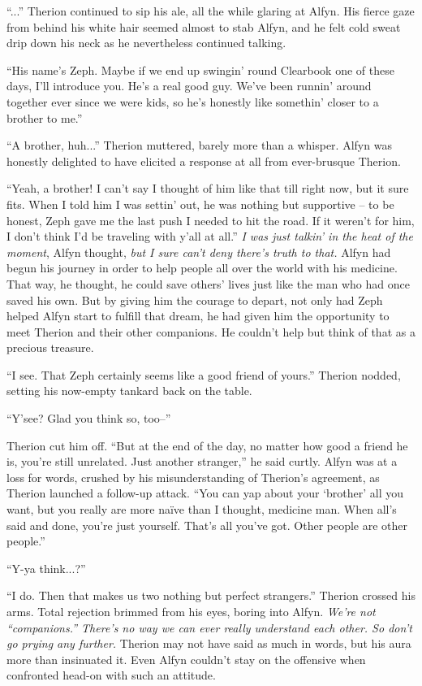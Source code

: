 ``...'' Therion continued to sip his ale, all the while glaring at Alfyn. His fierce gaze from behind his white hair seemed almost to stab Alfyn, and he felt cold sweat drip down his neck as he nevertheless continued talking.

``His name's Zeph. Maybe if we end up swingin' round Clearbook one of these days, I'll introduce you. He's a real good guy. We've been runnin' around together ever since we were kids, so he's honestly like somethin' closer to a brother to me.''

``A brother, huh...'' Therion muttered, barely more than a whisper. Alfyn was honestly delighted to have elicited a response at all from ever-brusque Therion.

``Yeah, a brother! I can't say I thought of him like that till right now, but it sure fits. When I told him I was settin' out, he was nothing but supportive -- to be honest, Zeph gave me the last push I needed to hit the road. If it weren't for him, I don't think I'd be traveling with y'all at all.'' \emph{I was just talkin' in the heat of the moment}, Alfyn thought, \emph{but I sure can't deny there's truth to that.} Alfyn had begun his journey in order to help people all over the world with his medicine. That way, he thought, he could save others' lives just like the man who had once saved his own. But by giving him the courage to depart, not only had Zeph helped Alfyn start to fulfill that dream, he had given him the opportunity to meet Therion and their other companions. He couldn't help but think of that as a precious treasure.

``I see. That Zeph certainly seems like a good friend of yours.'' Therion nodded, setting his now-empty tankard back on the table.

``Y'see? Glad you think so, too--''

Therion cut him off. ``But at the end of the day, no matter how good a friend he is, you're still unrelated. Just another stranger,'' he said curtly. Alfyn was at a loss for words, crushed by his misunderstanding of Therion's agreement, as Therion launched a follow-up attack. ``You can yap about your `brother' all you want, but you really are more naïve than I thought, medicine man. When all's said and done, you're just yourself. That's all you've got. Other people are other people.''

``Y-ya think...?''

``I do. Then that makes us two nothing but perfect strangers.'' Therion crossed his arms. Total rejection brimmed from his eyes, boring into Alfyn. \emph{We're not ``companions.'' There's no way we can ever really understand each other. So don't go prying any further.} Therion may not have said as much in words, but his aura more than insinuated it. Even Alfyn couldn't stay on the offensive when confronted head-on with such an attitude. 

